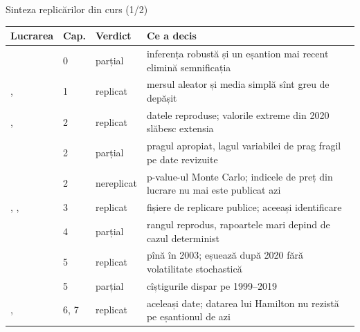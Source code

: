 \begin{frame}{Sinteza replicărilor din curs (1/2)}
\itemsize{\small}
\begin{center}
\scriptsize
\begin{tabular}{>{\raggedright\arraybackslash}p{4.3cm}l>{\raggedright\arraybackslash}p{1.7cm}>{\raggedright\arraybackslash}p{6.2cm}}
\toprule
\textbf{Lucrarea} & \textbf{Cap.} & \textbf{Verdict} & \textbf{Ce a decis} \\
\midrule
{}{} & 0 & parțial & inferența robustă și un eșantion mai recent elimină semnificația \\
, {} & 1 & replicat & mersul aleator și media simplă sînt greu de depășit \\
, {} & 2 & replicat & datele reproduse; valorile extreme din 2020 slăbesc extensia \\
{} & 2 & parțial & pragul apropiat, lagul variabilei de prag fragil pe date revizuite \\
{} & 2 & nereplicat & p-value-ul Monte Carlo; indicele de preț din lucrare nu mai este publicat azi \\
, , {} & 3 & replicat & fișiere de replicare publice; aceeași identificare \\
{} & 4 & parțial & rangul reprodus, rapoartele mari depind de cazul determinist \\
{} & 5 & replicat & pînă în 2003; eșuează după 2020 fără volatilitate stochastică \\
{} & 5 & parțial & cîștigurile dispar pe 1999--2019 \\
, {} & 6, 7 & replicat & aceleași date; datarea lui Hamilton nu rezistă pe eșantionul de azi \\
\bottomrule
\end{tabular}
\end{center}
\end{frame}

